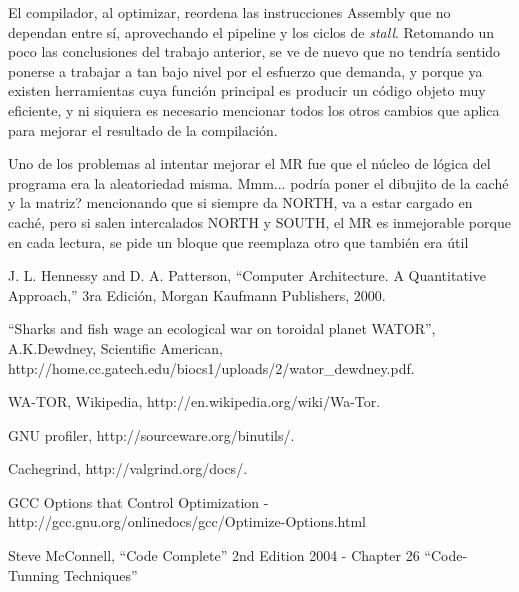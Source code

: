 \documentclass[a4paper,10pt]{article}
\begin{document}
    El compilador, al optimizar, reordena las instrucciones Assembly que no dependan entre s\'i, aprovechando el pipeline y los ciclos de \textit{stall}. Retomando un poco las conclusiones del trabajo anterior, se ve de nuevo que no tendr\'ia sentido ponerse a trabajar a tan bajo nivel por el esfuerzo que demanda, y porque ya existen herramientas cuya funci\'on principal es producir un c\'odigo objeto muy eficiente, y ni siquiera es necesario mencionar todos los otros cambios que aplica para mejorar el resultado de la compilaci\'on.

    Uno de los problemas al intentar mejorar el MR fue que el n\'ucleo de l\'ogica del programa era la aleatoriedad misma. Mmm... podr\'ia poner el dibujito de la cach\'e y la matriz? mencionando que si siempre da NORTH, va a estar cargado en cach\'e, pero si salen intercalados NORTH y SOUTH, el MR es inmejorable porque en cada lectura, se pide un bloque que reemplaza otro que tambi\'en era \'util

    
\begin{thebibliography}{99}

 J. L. Hennessy and D. A. Patterson, ``Computer Architecture. A Quantitative
Approach,'' 3ra Edici\'on, Morgan Kaufmann Publishers, 2000.

 ``Sharks and fish wage an ecological war on toroidal planet WATOR'', A.K.Dewdney, Scientific American,\\
http://home.cc.gatech.edu/biocs1/uploads/2/wator\_dewdney.pdf.

 WA-TOR, Wikipedia, http://en.wikipedia.org/wiki/Wa-Tor.

 GNU profiler, http://sourceware.org/binutils/.

 Cachegrind, http://valgrind.org/docs/.

 GCC Options that Control Optimization - http://gcc.gnu.org/onlinedocs/gcc/Optimize-Options.html

 Steve McConnell, ``Code Complete'' 2nd Edition 2004 - Chapter 26 ``Code-Tunning Techniques''

\end{thebibliography}
\end{document}

